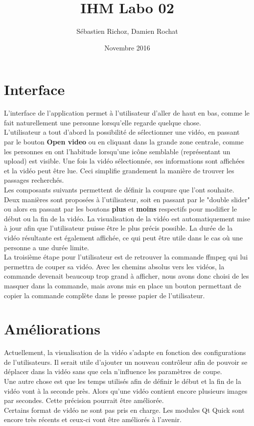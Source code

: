 \documentclass[11pt, a4paper, french]{article}
\title{IHM Labo 02}
\author{Sébastien Richoz, Damien Rochat}
\date{Novembre 2016}
\begin{document}
	\maketitle

	\part*{Interface}
		 L'interface de l'application permet à l'utilisateur d'aller de haut en bas, comme le fait naturellement une personne lorsqu'elle regarde quelque chose. \\
		 
		 L'utilisateur a tout d'abord la possibilité de sélectionner une vidéo, en passant par le bouton \textbf{Open video} ou en cliquant dans la grande zone centrale, comme les personnes en ont l'habitude lorsqu'une icône semblable (représentant un upload) est visible. Une fois la vidéo sélectionnée, ses informations sont affichées et la vidéo peut être lue. Ceci simplifie grandement la manière de trouver les passages recherchés. \\
		 
		 Les composants suivants permettent de définir la coupure que l'ont souhaite. Deux manières sont proposées à l'utilisateur, soit en passant par le "double slider" ou alors en passant par les boutons \textbf{plus} et \textbf{moins} respectifs pour modifier le début ou la fin de la vidéo. La visualisation de la vidéo est automatiquement mise à jour afin que l'utilisateur puisse être le plus précis possible. La durée de la vidéo résultante est également affichée, ce qui peut être utile dans le cas où une personne a une durée limite. \\
		 
		 La troisième étape pour l'utilisateur est de retrouver la commande ffmpeg qui lui permettra de couper sa vidéo. Avec les chemins absolus vers les vidéos, la commande devenait beaucoup trop grand à afficher, nous avons donc choisi de les masquer dans la commande, mais avons mis en place un bouton permettant de copier la commande complète dans le presse papier de l'utilisateur.

	\part*{Améliorations}
		Actuellement, la visualisation de la vidéo s'adapte en fonction des configurations de l'utilisateurs. Il serait utile d'ajouter un nouveau contrôleur afin de pouvoir se déplacer dans la vidéo sans que cela n'influence les paramètres de coupe. \\
		
		Une autre chose est que les temps utilisés afin de définir le début et la fin de la vidéo vont à la seconde près. Alors qu'une vidéo contient encore plusieurs images par secondes. Cette précision pourrait être améliorée. \\
		
		Certains format de vidéo ne sont pas pris en charge. Les modules Qt Quick sont encore très récents et ceux-ci vont être améliorés à l'avenir.
	
\end{document}
